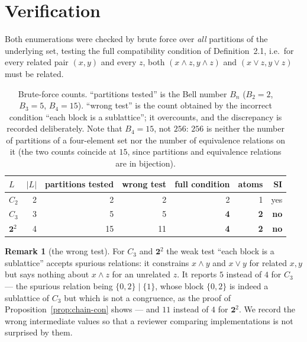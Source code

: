 \documentclass[11pt]{article}
\theoremstyle{definition}
\newtheorem{remark}[theorem]{Remark}
\begin{document}
\section{Verification}

Both enumerations were checked by brute force over \emph{all} partitions of
the underlying set, testing the full compatibility condition of
Definition~2.1, i.e.\ for every related pair $(x,y)$ and every $z$, both
$(x \wedge z, y \wedge z)$ and $(x \vee z, y \vee z)$ must be related.

\begin{table}[h]
\centering
\begin{tabular}{lrrrrrr}
\toprule
$L$ & $|L|$ & partitions tested & wrong test & full condition & atoms & SI\\
\midrule
$C_2$ & 2 & 2  & 2  & 2 & 1 & yes\\
$C_3$ & 3 & 5  & 5  & \textbf{4} & \textbf{2} & \textbf{no}\\
$\mathbf{2}^2$ & 4 & 15 & 11 & \textbf{4} & \textbf{2} & \textbf{no}\\
\bottomrule
\end{tabular}
\caption{Brute-force counts. ``partitions tested'' is the Bell number $B_n$
($B_2 = 2$, $B_3 = 5$, $B_4 = 15$). ``wrong test'' is the count obtained by
the incorrect condition ``each block is a sublattice''; it overcounts, and the
discrepancy is recorded deliberately. Note that $B_4 = 15$, not $256$: $256$
is neither the number of partitions of a four-element set nor the number of
equivalence relations on it (the two counts coincide at $15$, since
partitions and equivalence relations are in bijection).}
\end{table}

\begin{remark}[the wrong test]\label{rem:method}
For $C_3$ and $\mathbf{2}^2$ the weak test ``each block is a sublattice''
accepts spurious relations: it constrains $x \wedge y$ and $x \vee y$ for
related $x, y$ but says nothing about $x \wedge z$ for an unrelated $z$. It
reports $5$ instead of $4$ for $C_3$ --- the spurious relation being
$\{0,2\}\!\mid\!\{1\}$, whose block $\{0,2\}$ is indeed a sublattice of $C_3$
but which is not a congruence, as the proof of
Proposition~\ref{prop:chain-con} shows --- and $11$ instead of $4$ for
$\mathbf{2}^2$. We record the wrong intermediate values so that a reviewer
comparing implementations is not surprised by them.
\end{remark}
\end{document}
